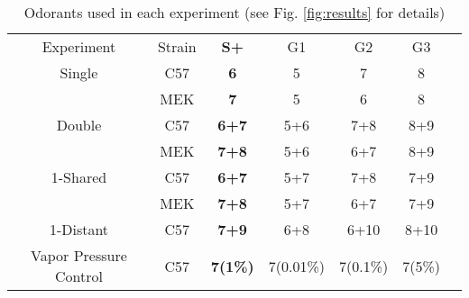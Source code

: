 \label{tab:design}
\begin{table}
    \begin{tabular}{ c c c c c c c }
        Experiment & Strain & \textbf{S+} & G1 & G2 & G3 \\ 
        Single & C57 & \textbf{6} & 5 & 7 & 8 &   \\ 
         & MEK & \textbf{7} & 5 & 6 & 8 &  \\ 
        Double & C57 & \textbf{6+7} & 5+6 & 7+8 & 8+9 &    \\ 
         & MEK & \textbf{7+8} & 5+6 & 6+7 & 8+9 &   \\ 
        1-Shared & C57 & \textbf{6+7} & 5+7 & 7+8 & 7+9 &  \\ 
         & MEK & \textbf{7+8} & 5+7 & 6+7 & 7+9 &   \\ 
        1-Distant & C57 & \textbf{7+9} & 6+8 & 6+10 & 8+10 &    \\ 
        Vapor Pressure Control & C57 & \textbf{7(1\%)} & 7(0.01\%) & 7(0.1\%) & 7(5\%) &   \\ 
    \end{tabular}
    \caption{Odorants used in each experiment (see Fig. \ref{fig:results} for details)}
\end{table}